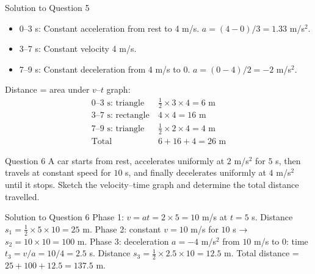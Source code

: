 \documentclass{beamer}
\begin{document}
\begin{frame}[shrink=15]{Solution to Question 5}
\begin{itemize}
    \item 0–3 s: Constant acceleration from rest to 4 m/s. $a = (4-0)/3 = 1.33$ m/s$^2$.
    \item 3–7 s: Constant velocity 4 m/s.
    \item 7–9 s: Constant deceleration from 4 m/s to 0. $a = (0-4)/2 = -2$ m/s$^2$.
\end{itemize}
Distance = area under $v$–$t$ graph:
\begin{align*}
\text{0–3 s: triangle} &\ \frac12 \times 3 \times 4 = 6 \text{ m} \\
\text{3–7 s: rectangle} &\ 4 \times 4 = 16 \text{ m} \\
\text{7–9 s: triangle} &\ \frac12 \times 2 \times 4 = 4 \text{ m} \\
\text{Total} &\ 6+16+4 = 26 \text{ m}
\end{align*}
\end{frame}

\begin{frame}[shrink=15]{Question 6}
A car starts from rest, accelerates uniformly at $2$ m/s$^2$ for $5$ s, then travels at constant speed for $10$ s, and finally decelerates uniformly at $4$ m/s$^2$ until it stops. Sketch the velocity–time graph and determine the total distance travelled.
\end{frame}

\begin{frame}[shrink=15]{Solution to Question 6}
Phase 1: $v = at = 2\times5 = 10$ m/s at $t=5$ s. Distance $s_1 = \frac12 \times 5 \times 10 = 25$ m.
Phase 2: constant $v=10$ m/s for $10$ s → $s_2 = 10\times10 = 100$ m.
Phase 3: deceleration $a=-4$ m/s$^2$ from $10$ m/s to $0$: time $t_3 = v/a = 10/4 = 2.5$ s. Distance $s_3 = \frac12 \times 2.5 \times 10 = 12.5$ m.
Total distance = $25+100+12.5 = 137.5$ m.
\begin{center}
\end{center}
\end{frame}
\end{document}
